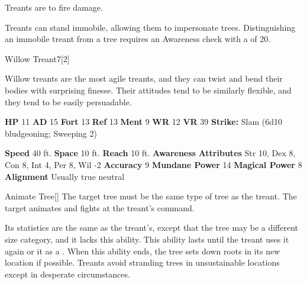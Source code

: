         Treants are  to fire damage.
      
        Treants can stand immobile, allowing them to impersonate trees.
        Distinguishing an immobile treant from a tree requires an Awareness check with a  of 20.
  

  \begin{monsubsection}{Willow Treant}{7}[2]
    \vspace{-1em}\vspace{-1em}
    \vspace{0em}

    
          Willow treants are the most agile treants, and they can twist and bend their bodies with surprising finesse.
          Their attitudes tend to be similarly flexible, and they tend to be easily persuadable.
        

    \begin{spellcontent}
      \begin{spelltargetinginfo}
        \pari \textbf{HP} 11 \monsep
          \textbf{AD} 15 \monsep
          \textbf{Fort} 13 \monsep
          \textbf{Ref} 13 \monsep
          \textbf{Ment} 9
        \pari \textbf{WR} 12 \monsep
        \textbf{VR} 39
        \pari \textbf{Strike:}
            Slam  (6d10 bludgeoning; Sweeping 2)
      \end{spelltargetinginfo}
    \end{spellcontent}
    \begin{monsterfooter}
      \pari \textbf{Speed} 40 ft. \monsep
        \textbf{Space} 10 ft. \monsep
        \textbf{Reach} 10 ft.
      \pari \textbf{Awareness} 
      \pari \textbf{Attributes}
        Str 10, Dex 8,
        Con 8, Int 4,
        Per 8, Wil -2
      \pari \textbf{Accuracy} 9 \monsep
        \textbf{Mundane Power} 14 \monsep
      \textbf{Magical Power} 8
      \pari \textbf{Alignment} Usually true neutral
    \end{monsterfooter}
  \end{monsubsection}
  \begin{freeability}{Animate Tree}[]
      The target tree must be the same type of tree as the treant.
        The target animates and fights at the treant's command.

        Its statistics are the same as the treant's, except that the tree may be a different size category, and it lacks this ability.
        This ability lasts until the treant uses it again or  it as a .
        When this ability ends, the tree sets down roots in its new location if possible.
        Treants avoid stranding trees in unsustainable locations except in desperate circumstances.
    \end{freeability}
  
